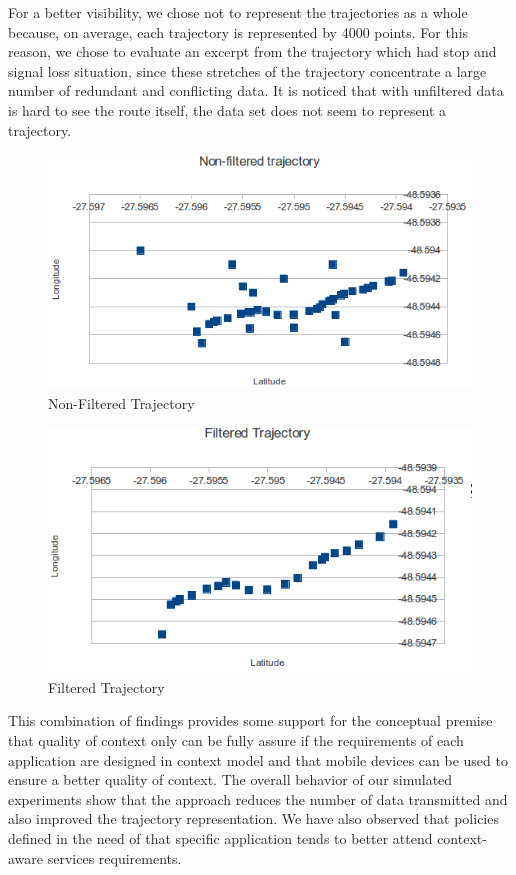 \documentclass[letterpaper,conference]{IEEEtran}
\begin{document}
  For a better visibility, we chose not to represent the trajectories as a whole because,
  on average, each trajectory is represented by 4000 points. For this reason, we chose to
  evaluate an excerpt from the trajectory which had stop and signal loss situation, since
  these stretches of the trajectory concentrate a large number of redundant and 
  conflicting data. It is noticed that with unfiltered data is hard to see the route 
  itself, the data set does not seem to represent a trajectory.
  
\begin{figure}[!h]
 \centering
  \includegraphics[scale=0.35]{imagens/NonfilteredTrajectory}
 \caption{Non-Filtered Trajectory}
 \label{non-filtered}
 \end{figure}
 
  \begin{figure}[!h]
 \centering
  \includegraphics[scale=0.35]{imagens/FilteredTrajectory}
  \caption{Filtered Trajectory}
  \label{filtered}
 \end{figure}
 
 This combination of findings provides some support for the conceptual premise that 
 quality of context only can be fully assure if the requirements of each application 
 are designed in context model and that mobile devices can be used to ensure a better 
 quality of context. The overall behavior of our simulated experiments show that the 
 approach reduces the number of data transmitted and also improved the trajectory 
 representation. We have also observed that policies defined in the need of that 
 specific application tends to better attend context-aware services requirements.
 
\end{document}
